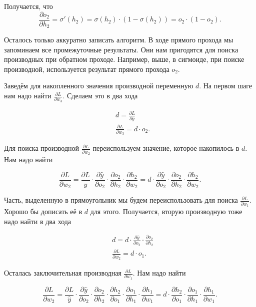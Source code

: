 \begin{sol}
Получается, что 
\[
\frac{\partial o_2}{\partial h_2} = \sigma'(h_2) = \sigma(h_2) \cdot (1 - \sigma(h_2)) = o_2 \cdot (1 - o_2).
\]

Осталось только аккуратно записать алгоритм. В ходе прямого прохода мы запоминаем все промежуточные результаты. Они нам пригодятся для поиска производных при обратном проходе. Например, выше, в сигмоиде, при поиске производной, используется результат прямого прохода $o_2.$

Заведём для накопленного значения производной переменную $d$. На первом шаге нам надо найти $\frac{\partial L}{\partial w_3}$. Сделаем это в два хода

\begin{equation*} 
	\begin{aligned}
		&  d = \frac{\partial L}{\partial \hat y} \\
		&  \frac{\partial L}{\partial w_3} = d \cdot o_2.
	\end{aligned}
\end{equation*}

Для поиска производной $\frac{\partial L}{\partial w_2}$ переиспользуем значение, которое накопилось в $d$. Нам надо найти 

\[
\frac{\partial L}{\partial w_2} = \frac{\partial L}{\hat y} \cdot \frac{\partial \hat y}{\partial o_2} \cdot \frac{\partial o_2}{\partial h_2} \cdot \frac{\partial h_2}{\partial w_2} = d \cdot \boxed{ \frac{\partial \hat y}{\partial o_2} \cdot \frac{\partial o_2}{\partial h_2} } \cdot \frac{\partial h_2}{\partial w_2}.
\]

Часть, выделенную в прямоугольник мы будем переиспользовать для поиска $\frac{\partial L}{\partial w_1}$. Хорошо бы дописать её в $d$ для этого. Получается, вторую производную тоже надо найти в два хода

\begin{equation*} 
	\begin{aligned}
		&  d = d \cdot \frac{\partial \hat y}{\partial o_2} \cdot \frac{\partial o_2}{\partial h_2} \\
		&  \frac{\partial L}{\partial w_2} = d \cdot o_1.
	\end{aligned}
\end{equation*}

Осталась заключительная производная $\frac{\partial L}{\partial w_1}$. Нам надо найти 

\[
\frac{\partial L}{\partial w_2} = \frac{\partial L}{\hat y} \cdot \frac{\partial \hat y}{\partial o_2} \cdot \frac{\partial o_2}{\partial h_2} \cdot \frac{\partial h_2}{\partial o_1} \cdot \frac{\partial o_1}{\partial h_1}  \cdot \frac{\partial h_1}{\partial w_1}  = d \cdot \frac{\partial h_2}{\partial o_1} \cdot \frac{\partial o_1}{\partial h_1}  \cdot \frac{\partial h_1}{\partial w_1}.
\]


\end{sol}
